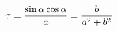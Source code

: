 \documentclass[preview]{standalone}
\begin{document}
\begin{align*}
\special{dvisvgm:raw <g id='unique000'>}\tau=\dfrac{\sin\alpha\cos\alpha}{a}=\dfrac{b}{a^2+b^2}\special{dvisvgm:raw </g>}
\end{align*}
\end{document}
